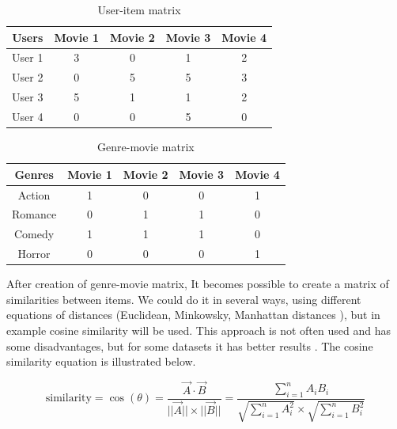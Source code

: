 \begin{table}[h]
    \centering
    \begin{tabular}{|c|c|c|c|c|}
        \hline
        \textbf{Users} & \textbf{Movie 1} & \textbf{Movie 2} & \textbf{Movie 3} & \textbf{Movie 4} \\        
        \hline
        User 1 & 3 & 0 & 1 & 2\\
        \hline
        User 2 & 0 & 5 & 5 & 3\\
        \hline
        User 3 & 5 & 1 & 1 & 2\\
        \hline
        User 4 & 0 & 0 & 5 & 0\\
        \hline
    \end{tabular}
    \caption{User-item matrix}\label{tab:user_item_matrix}
\end{table}

\begin{table}[h]
    \centering
    \begin{tabular}{|c|c|c|c|c|}
        \hline
        \textbf{Genres} & \textbf{Movie 1} & \textbf{Movie 2} & \textbf{Movie 3} & \textbf{Movie 4} \\        
        \hline
        Action  & 1 & 0 & 0 & 1\\
        \hline
        Romance & 0 & 1 & 1 & 0\\
        \hline
        Comedy  & 1 & 1 & 1 & 0\\
        \hline
        Horror  & 0 & 0 & 0 & 1\\
        \hline
    \end{tabular}
    \caption{Genre-movie matrix}\label{tab:genre_movie_matrix}
\end{table}

After creation of genre-movie matrix, It becomes possible to create a matrix of similarities between items. We could do it in several ways, using different equations of distances (Euclidean, Minkowsky, Manhattan distances \cite{Different_KNN_distances}), but in example cosine similarity will be used. This approach is not often used and has some disadvantages, but for some datasets it has better results \cite{Cosine_Similarity}. The cosine similarity equation is illustrated below.

\begin{equation}
    \text{similarity} = \cos(\theta) = \frac{\vec{A} \cdot \vec{B}}{||\vec{A}|| \times ||\vec{B}||} = \frac{\sum_{i=1}^{n} A_i B_i}{\sqrt{\sum_{i=1}^{n} A_i^2} \times \sqrt{\sum_{i=1}^{n} B_i^2}}\label{equ:cosine_similarity}
\end{equation}

